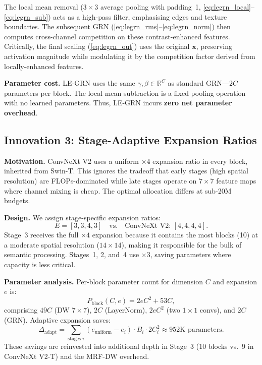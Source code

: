 \documentclass{article}
\begin{document}
The local mean removal ($3\times3$ average pooling with padding~1,
\ref{eq:legrn_local}--\ref{eq:legrn_sub}) acts as a high-pass filter,
emphasising edges and texture boundaries.  The subsequent GRN
(\ref{eq:legrn_rms}--\ref{eq:legrn_norm}) then computes cross-channel
competition on these contrast-enhanced features.  Critically, the final
scaling (\ref{eq:legrn_out}) uses the original $\mathbf{x}$, preserving
activation magnitude while modulating it by the competition factor
derived from locally-enhanced features.

\textbf{Parameter cost.}  LE-GRN uses the same $\gamma, \beta \in
\mathbb{R}^C$ as standard GRN---$2C$ parameters per block.  The local
mean subtraction is a fixed pooling operation with no learned
parameters.  Thus, LE-GRN incurs \textbf{zero net parameter overhead}.

\subsection{Innovation 3: Stage-Adaptive Expansion Ratios}

\textbf{Motivation.}  ConvNeXt V2 uses a uniform $\times4$ expansion
ratio in every block, inherited from Swin-T.  This ignores the tradeoff
that early stages (high spatial resolution) are FLOPs-dominated while
late stages operate on $7\times7$ feature maps where channel mixing is
cheap.  The optimal allocation differs at sub-20M budgets.

\textbf{Design.}  We assign stage-specific expansion ratios:
\begin{equation}
  E = [3, 3, 4, 3] \quad \text{vs.} \quad \text{ConvNeXt V2: } [4, 4, 4, 4].
\end{equation}
Stage~3 receives the full $\times4$ expansion because it contains the
most blocks (10) at a moderate spatial resolution ($14\times14$),
making it responsible for the bulk of semantic processing.  Stages~1,
2, and~4 use $\times3$, saving parameters where capacity is less
critical.

\textbf{Parameter analysis.}  Per-block parameter count for dimension
$C$ and expansion $e$ is:
\begin{equation}
  P_{\text{block}}(C, e) = 2eC^2 + 53C,
\label{eq:block_params}
\end{equation}
comprising $49C$ (DW $7\times7$), $2C$ (LayerNorm), $2eC^2$ (two
$1\times1$ convs), and $2C$ (GRN).  Adaptive expansion saves:
\begin{equation}
  \Delta_{\text{adapt}} = \sum_{\text{stages } i}
    (e_{\text{uniform}} - e_i) \cdot B_i \cdot 2C_i^2
    \approx 952\text{K parameters}.
\label{eq:adapt_savings}
\end{equation}
These savings are reinvested into additional depth in Stage~3 (10
blocks vs.\ 9 in ConvNeXt V2-T) and the MRF-DW overhead.
\end{document}
